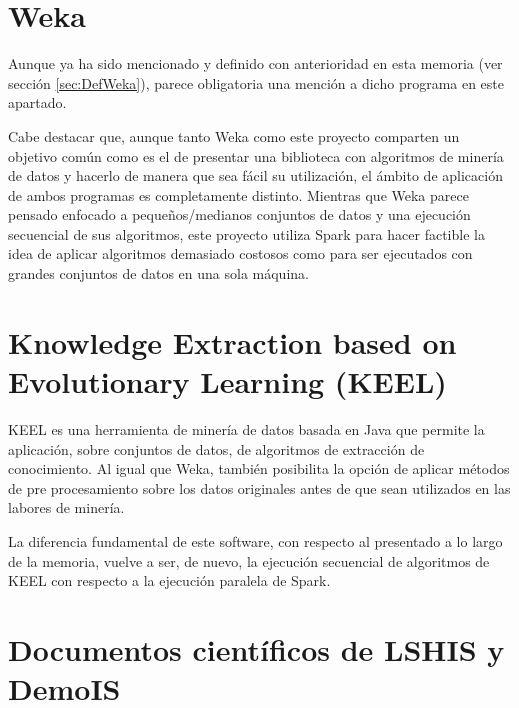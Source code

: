 

\section{Weka}

Aunque ya ha sido mencionado y definido con anterioridad en esta memoria (ver sección \ref{sec:DefWeka}), parece obligatoria una mención a dicho programa en este apartado.

Cabe destacar que, aunque tanto Weka como este proyecto comparten un objetivo común como es el de presentar una biblioteca con algoritmos de minería de datos y hacerlo de manera que sea fácil su utilización, el ámbito de aplicación de ambos programas es completamente distinto. Mientras que Weka parece pensado enfocado a pequeños/medianos conjuntos de datos y una ejecución secuencial de sus algoritmos, este proyecto utiliza Spark para hacer factible la idea de aplicar algoritmos demasiado costosos como para ser ejecutados con grandes conjuntos de datos en una sola máquina.

\section{Knowledge Extraction based on Evolutionary Learning (KEEL)}

KEEL \cite{KEELSoft1,KEELSoft2} es una herramienta de minería de datos basada en Java que permite la aplicación, sobre conjuntos de datos, de algoritmos de extracción de conocimiento. Al igual que Weka, también posibilita la opción de aplicar métodos de pre procesamiento sobre los datos originales antes de que sean utilizados en las labores de minería.

La diferencia fundamental de este software, con respecto al presentado a lo largo de la memoria, vuelve a ser, de nuevo, la ejecución secuencial de algoritmos de KEEL con respecto a la ejecución paralela de Spark.

\section{Documentos científicos de LSHIS y DemoIS}

